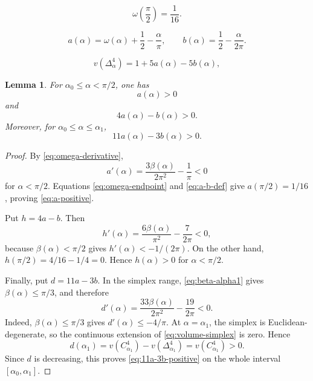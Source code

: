 \documentclass[10pt,a4paper]{amsart}
\newtheorem{lemma}{Lemma}
\begin{document}
\begin{equation}\label{eq:omega-endpoint}
 \omega\left(\frac{\pi}{2}\right)=\frac1{16}.
\end{equation}

\begin{equation}\label{eq:a-b-def}
 a(\alpha)=\omega(\alpha)+\frac12-\frac{\alpha}{\pi},
 \qquad
 b(\alpha)=\frac12-\frac{\alpha}{2\pi}.
\end{equation}

\begin{equation}\label{eq:volume-simplex}
 v(\Delta^4_\alpha)=1+5a(\alpha)-5b(\alpha),
\end{equation}

\begin{lemma}\label{lem:coefficients}
For $\alpha_0\leq\alpha<\pi/2$, one has
\begin{equation}\label{eq:a-positive}
 a(\alpha)>0
\end{equation}
and
\begin{equation}\label{eq:4a-b-positive}
 4a(\alpha)-b(\alpha)>0.
\end{equation}
Moreover, for $\alpha_0\leq\alpha\leq\alpha_1$,
\begin{equation}\label{eq:11a-3b-positive}
 11a(\alpha)-3b(\alpha)>0.
\end{equation}
\end{lemma}

\begin{proof}
By \eqref{eq:omega-derivative},
\[
 a'(\alpha)=\frac{3\beta(\alpha)}{2\pi^2}-\frac1\pi<0
\]
for $\alpha<\pi/2$.  Equations \eqref{eq:omega-endpoint} and
\eqref{eq:a-b-def} give $a(\pi/2)=1/16$, proving
\eqref{eq:a-positive}.

Put $h=4a-b$.  Then
\[
 h'(\alpha)=\frac{6\beta(\alpha)}{\pi^2}-\frac{7}{2\pi}<0,
\]
because $\beta(\alpha)<\pi/2$ gives
$h'(\alpha)<-1/(2\pi)$.  On the other hand,
$h(\pi/2)=4/16-1/4=0$.  Hence $h(\alpha)>0$ for
$\alpha<\pi/2$.

Finally, put $d=11a-3b$.  In the simplex range,
\eqref{eq:beta-alpha1} gives $\beta(\alpha)\leq\pi/3$, and therefore
\[
 d'(\alpha)=\frac{33\beta(\alpha)}{2\pi^2}
 -\frac{19}{2\pi}<0.
\]
Indeed, $\beta(\alpha)\leq\pi/3$ gives
$d'(\alpha)\leq-4/\pi$.
At $\alpha=\alpha_1$, the simplex is Euclidean-degenerate, so the continuous
extension of \eqref{eq:volume-simplex} is zero.  Hence
\[
 d(\alpha_1)=v(C^4_{\alpha_1})-v(\Delta^4_{\alpha_1})
 =v(C^4_{\alpha_1})>0.
\]
Since $d$ is decreasing, this proves \eqref{eq:11a-3b-positive} on the whole
interval $[\alpha_0,\alpha_1]$.
\end{proof}
\end{document}
